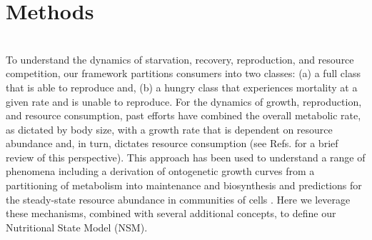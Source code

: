 \documentclass[twocolumn,preprintnumbers,amsmath,amssymb,superscriptaddress]{revtex4}
\begin{document}
\section*{Methods}
\small{
\\
To understand the dynamics of starvation, recovery, reproduction, and resource competition, our framework partitions consumers into two classes: (a) a full class that is able to reproduce and, (b) a hungry class that experiences mortality at a given rate and is unable to reproduce. For the dynamics of growth, reproduction, and resource consumption, past efforts have combined the overall metabolic rate, as dictated by body size, with a growth rate that is dependent on resource abundance and, in turn, dictates resource consumption (see Refs. \citep{Kempes:2012hy,kempes2014morphological} for a brief review of this perspective). This approach has been used to understand a range of phenomena including a derivation of ontogenetic growth curves from a partitioning of metabolism into maintenance and biosynthesis  \citep{West:2001bv,moses2008rmo,hou,Kempes:2012hy} and predictions for the steady-state resource abundance in communities of cells \citep{kempes2014morphological}. Here we leverage these mechanisms, combined with several additional concepts, to define our Nutritional State Model (NSM).

}
\end{document}
